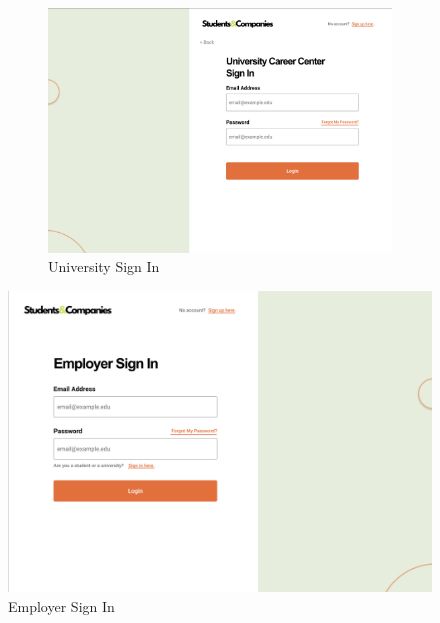 \documentclass[a4paper,12pt]{article}
\begin{document}
\begin{figure}[H]
    \centering
\begin{figure}[H]
    \centering
    \includegraphics[scale = 0.40]{figures/UserInterfaces/General/UniversitySignIn.png}
    \caption{University Sign In}
     \centering
\end{figure}
    \includegraphics[scale = 0.40]{figures/UserInterfaces/General/EmployerSignIn.png}
    \caption{Employer Sign In}
     \centering
\end{figure}
\end{document}
